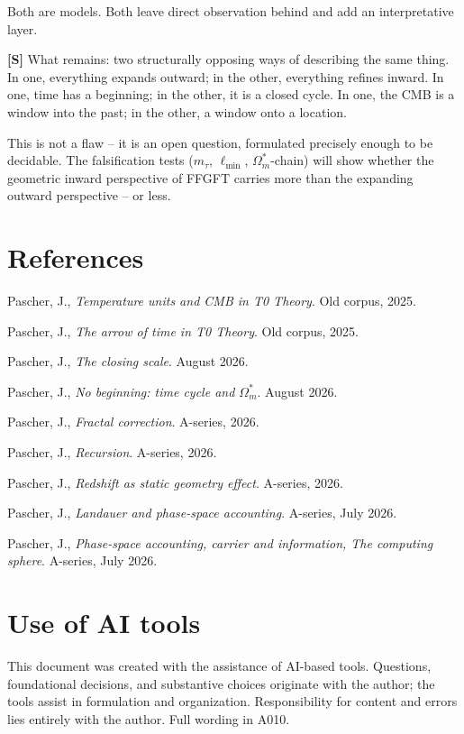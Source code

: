 Both are models. Both leave direct observation behind and
add an interpretative layer.

\textbf{[S]} What remains: two structurally opposing ways
of describing the same thing. In one, everything expands outward;
in the other, everything refines inward. In one, time has a beginning;
in the other, it is a closed cycle. In one, the CMB is a window into
the past; in the other, a window onto a location.

This is not a flaw -- it is an open question, formulated precisely
enough to be decidable. The falsification tests
($m_\tau$, $\ell_\text{min}$, $\Omega_m^*$-chain) will show
whether the geometric inward perspective of FFGFT carries more
than the expanding outward perspective -- or less.

\section{References}

\begin{description}[leftmargin=3.2em,style=sameline,itemsep=0.3em]
	\small
	\item[{Doc.~061}] Pascher, J., \emph{Temperature units and CMB in
		T0 Theory}. Old corpus, 2025.
	\item[{Doc.~157}] Pascher, J., \emph{The arrow of time in T0 Theory}.
	Old corpus, 2025.
	\item[{Doc.~312}] Pascher, J., \emph{The closing scale}. August 2026.
	\item[{Doc.~313}] Pascher, J., \emph{No beginning: time cycle and
		$\Omega_m^*$}. August 2026.
	\item[{A040}] Pascher, J., \emph{Fractal correction}. A-series, 2026.
	\item[{A050}] Pascher, J., \emph{Recursion}. A-series, 2026.
	\item[{A265}] Pascher, J., \emph{Redshift as static geometry effect}.
	A-series, 2026.
	\item[{A271}] Pascher, J., \emph{Landauer and phase-space accounting}.
	A-series, July 2026.
	\item[{A280--A282}] Pascher, J., \emph{Phase-space accounting, carrier
		and information, The computing sphere}. A-series, July 2026.
\end{description}

\section{Use of AI tools}

This document was created with the assistance of AI-based tools.
Questions, foundational decisions, and substantive choices originate
with the author; the tools assist in formulation and organization.
Responsibility for content and errors lies entirely with the author.
Full wording in A010.